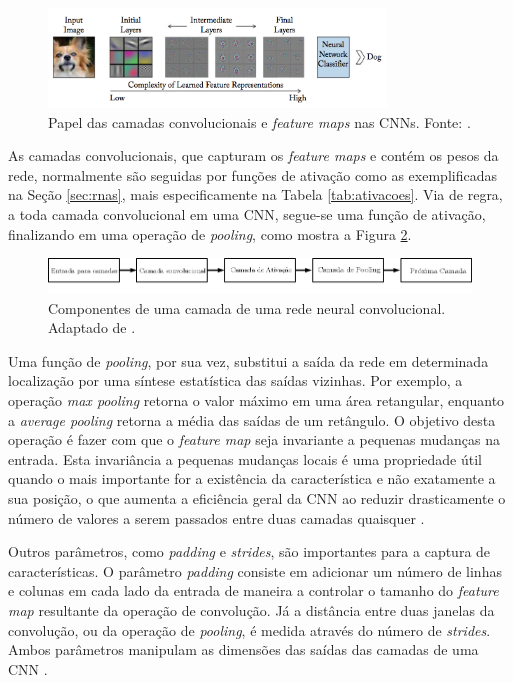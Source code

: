 \begin{figure}[!ht]
	\centering
	\caption{Papel das camadas convolucionais e \emph{feature maps} nas CNNs. Fonte: \cite{Khan:Livro}.}
	\label{fig:convolutions}
	\includegraphics[width=0.8\textwidth]{./img/fundamenta/convolutions}
\end{figure}

As camadas convolucionais, que capturam os \emph{feature maps} e contém os pesos da rede, normalmente são seguidas por funções de ativação como as exemplificadas na Seção \ref{sec:rnas}, mais especificamente na Tabela \ref{tab:ativacoes}. Via de regra, a toda camada convolucional em uma CNN, segue-se uma função de ativação, finalizando em uma operação de \emph{pooling}, como mostra a Figura \ref{fig:cnn_camada}.

\begin{figure}[!ht]
	\centering
	\caption{Componentes de uma camada de uma rede neural convolucional. Adaptado de \cite{goodfellow2016deep}.}
	\label{fig:cnn_camada}
	\includegraphics[width=\textwidth]{img/cnn_camada_ipe.png}
\end{figure}

 Uma função de \emph{pooling}, por sua vez, substitui a saída da rede em determinada localização por uma síntese estatística das saídas vizinhas. Por exemplo, a operação \emph{max pooling} retorna o valor máximo em uma área retangular, enquanto a \emph{average pooling} retorna a média das saídas de um retângulo. O objetivo desta operação é fazer com que o \emph{feature map} seja invariante a pequenas mudanças na entrada. Esta invariância a pequenas mudanças locais é uma propriedade útil quando o mais importante for a existência da característica e não exatamente a sua posição, o que aumenta a eficiência geral da CNN ao reduzir drasticamente o número de valores a serem passados entre duas camadas quaisquer \cite{goodfellow2016deep}.

 Outros parâmetros, como \emph{padding} e \emph{strides}, são importantes para a captura de características. O parâmetro \emph{padding} consiste em adicionar um número de linhas e colunas em cada lado da entrada de maneira a controlar o tamanho do \emph{feature map} resultante da operação de convolução. Já a distância entre duas janelas da convolução, ou da operação de \emph{pooling}, é medida através do número de \emph{strides}. Ambos parâmetros manipulam as dimensões das saídas das camadas de uma CNN \cite{chollet2017deep}.

